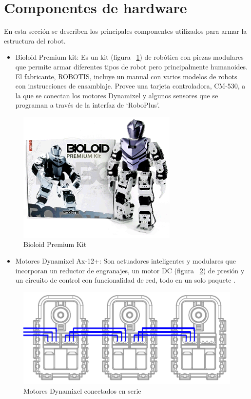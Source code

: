 \section{Componentes de hardware}
En esta sección se describen los principales componentes utilizados para armar la estructura del robot.
\begin{itemize}
\item Bioloid Premium kit: Es un kit (figura ~\ref{fig:kit}) de robótica con piezas modulares que permite armar diferentes tipos de robot pero principalmente humanoides. El fabricante, ROBOTIS, incluye un manual con varios modelos de robots con instrucciones de ensamblaje. Provee una tarjeta controladora, CM-530, a la que se conectan los motores Dynamixel y algunos sensores que se programan a través de la interfaz de ‘RoboPlus’. \cite{robotics}

\end{itemize}

\begin{figure}[hbtp]

\centering
\includegraphics[scale=0.5]{imagenes/product_bioloid17.png}
\caption{Bioloid Premium Kit}
\label{fig:kit}
\end{figure}

\begin{itemize}

\item Motores Dynamixel Ax-12+: Son actuadores inteligentes y modulares que incorporan un reductor de engranajes, un motor DC  (figura ~\ref{fig:motoresDc})
de presión y un circuito de control con funcionalidad de red, todo en un solo paquete \cite{manual}. 
\end{itemize}

\begin{figure}[hbtp]
\label{fig:motoresDc}
\centering
\includegraphics[scale=0.5]{imagenes/AX-12_serie.png}
\caption{Motores Dynamixel conectados en serie}
\end{figure}

